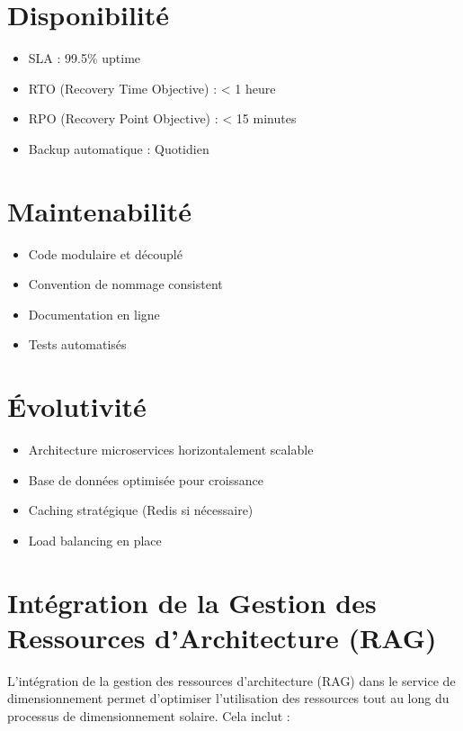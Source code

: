\documentclass[12pt,a4paper,french]{report}
\begin{document}
\section{Disponibilité}

\begin{itemize}
    \item SLA : 99.5\% uptime
    \item RTO (Recovery Time Objective) : < 1 heure
    \item RPO (Recovery Point Objective) : < 15 minutes
    \item Backup automatique : Quotidien
\end{itemize}

\section{Maintenabilité}

\begin{itemize}
    \item Code modulaire et découplé
    \item Convention de nommage consistent
    \item Documentation en ligne
    \item Tests automatisés
\end{itemize}

\section{Évolutivité}

\begin{itemize}
    \item Architecture microservices horizontalement scalable
    \item Base de données optimisée pour croissance
    \item Caching stratégique (Redis si nécessaire)
    \item Load balancing en place
\end{itemize}

\section{Intégration de la Gestion des Ressources d'Architecture (RAG)}

L'intégration de la gestion des ressources d'architecture (RAG) dans le service de dimensionnement permet d'optimiser l'utilisation des ressources tout au long du processus de dimensionnement solaire. Cela inclut :
\end{document}
